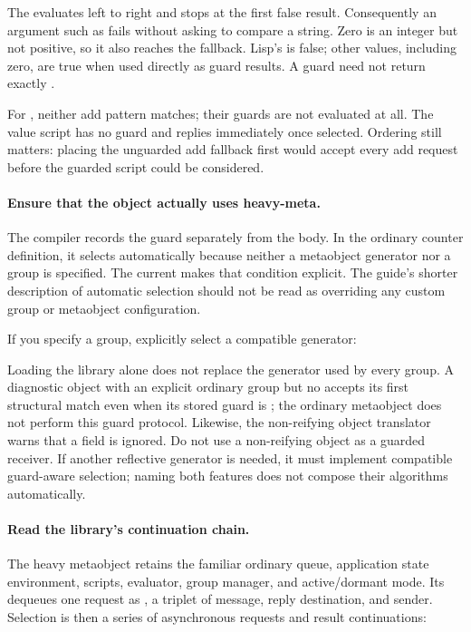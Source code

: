 The  evaluates left to right and stops at the first false
result. Consequently an argument such as  fails 
without asking  to compare a string. Zero is an integer
but not positive, so it also reaches the fallback. Lisp's 
is false; other values, including zero, are true when used directly
as guard results. A guard need not return exactly .

For \code{[:value]}, neither add pattern matches; their guards are
not evaluated at all. The value script has no guard and replies
immediately once selected. Ordering still matters: placing the
unguarded add fallback first would accept every add request before
the guarded script could be considered.

\paragraph{Ensure that the object actually uses heavy-meta.}
The compiler records the guard separately from the body. In the
ordinary counter definition, it selects  automatically
because neither a metaobject generator nor a group is specified.
The current  makes that condition explicit.
The guide's shorter description of automatic selection should not be
read as overriding any custom group or metaobject configuration.

If you specify a group, explicitly select a compatible generator:


Loading the library alone does not replace the generator used by every
group. A diagnostic object with an explicit ordinary group but no
 accepts its first structural match even when its stored
guard is ; the ordinary metaobject does not perform this
guard protocol. Likewise, the non-reifying object translator warns
that a  field is ignored. Do not use a non-reifying object
as a guarded receiver. If another reflective generator is needed,
it must implement compatible guard-aware selection; naming both
features does not compose their algorithms automatically.

\paragraph{Read the library's continuation chain.}
The heavy metaobject retains the familiar ordinary queue, application
state environment, scripts, evaluator, group manager, and active/dormant
mode. Its  dequeues one request as , a triplet
of message, reply destination, and sender. Selection is then a series
of asynchronous requests and result continuations:

